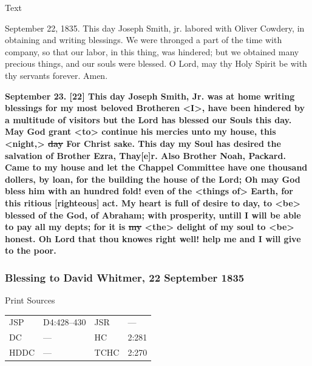 			\begin{description}
				\item[Text]
			\end{description}
			
				September 22, 1835. This day Joseph Smith, jr. labored with Oliver Cowdery, in obtaining and writing blessings. We were thronged a part of the time with company, so that our labor, in this thing, was hindered; but we obtained many precious things, and our souls were blessed. O Lord, may thy Holy Spirit be with thy servants forever. Amen.
				
				\textbf{September 23. [22] This day Joseph Smith, Jr. was at home writing blessings for my most beloved Brotheren <I>, have been hindered by a multitude of visitors but the Lord has blessed our Souls this day. May God grant <to> continue his mercies unto my house, this <night,> \sout{day} For Christ sake. This day my Soul has desired the salvation of Brother Ezra, Thay[e]r. Also Brother Noah, Packard. Came to my house and let the Chappel Committee have one thousand dollers, by loan, for the building the house of the Lord; Oh may God bless him with an hundred fold! even of the <things of> Earth, for this ritious [righteous] act. My heart is full of desire to day, to <be> blessed of the God, of Abraham; with prosperity, untill I will be able to pay all my depts; for it is \sout{my} <the> delight of my soul to <be> honest. Oh Lord that thou knowes right well! help me and I will give to the poor.}
					
		\subsubsection{Blessing to David Whitmer, 22 September 1835}
			\label{EMS-1835-JS-22-SEP-1835-DW}
			
			\begin{description}
				\item[Print Sources]
			\end{description}

				\begin{tabular}{p{0.5in}p{1in}p{0.5in}p{1in}}
				JSP	 	& D4:428--430		& JSR 		& --- \\
				DC	 	& --- 				& HC 		& 2:281 \\
				HDDC 	& ---				& TCHC 		& 2:270 \\
				\end{tabular}
			
